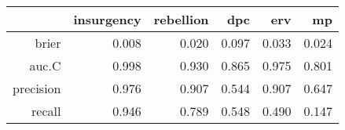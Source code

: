 \begin{tabular}{rrrrrr}
  \hline
 & insurgency & rebellion & dpc & erv & mp \\ 
  \hline
brier & 0.008 & 0.020 & 0.097 & 0.033 & 0.024 \\ 
  auc.C & 0.998 & 0.930 & 0.865 & 0.975 & 0.801 \\ 
  precision & 0.976 & 0.907 & 0.544 & 0.907 & 0.647 \\ 
  recall & 0.946 & 0.789 & 0.548 & 0.490 & 0.147 \\ 
   \hline
\end{tabular}

